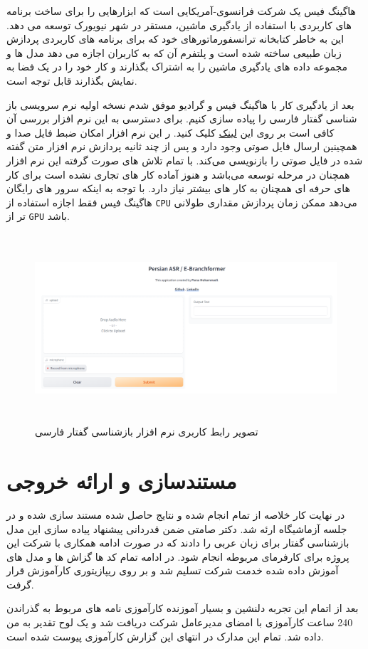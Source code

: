 هاگینگ فیس یک شرکت فرانسوی-آمریکایی است که ابزارهایی را برای ساخت برنامه های کاربردی با استفاده از یادگیری ماشین، مستقر در شهر نیویورک توسعه می دهد. این به خاطر کتابخانه ترانسفورماتورهای خود که برای برنامه های کاربردی پردازش زبان طبیعی ساخته شده است و پلتفرم آن که به کاربران اجازه می دهد مدل ها و مجموعه داده های یادگیری ماشین را به اشتراک بگذارند و کار خود را در یک فضا به نمایش بگذارند قابل توجه است.\cite{wolf2020huggingfaces}

بعد از یادگیری کار با هاگینگ فیس و گرادیو موفق شدم نسخه اولیه نرم سرویسی باز شناسی گفتار فارسی را پیاده سازی کنیم. برای دسترسی به این نرم افزار بررسی آن کافی است بر روی این \href{https://huggingface.co/spaces/parsa-mhmdi/persian-asr}{لینک} کلیک کنید.
ر این نرم افزار امکان ضبط فایل صدا و همچینین ارسال فایل صوتی وجود دارد و پس از چند ثانیه پردازش نرم افزار متن گفته شده در فایل صوتی را بازنویسی می‌کند.
با تمام تلاش های صورت گرفته این نرم افزار همچنان در مرحله توسعه می‌باشد و هنوز آماده کار های تجاری نشده است برای کار های حرفه ای همچنان به کار های بیشتر نیاز دارد. با توجه به اینکه سرور های رایگان هاگینگ فیس فقط اجازه استفاده از
\verb|CPU|
می‌دهد ممکن زمان پردازش مقداری طولانی تر از \verb|GPU|
باشد.

\begin{figure}[H]
  \centering
  \includegraphics[width=1\textwidth,height=7cm]{Images/Chapter3/UI.png}
  \caption{
  تصویر رابط کاربری نرم افزار بازشناسی گفتار فارسی 
  }
  \label{fig:UI}
\end{figure}

\section{مستندسازی و ارائه خروجی}
در نهایت کار خلاصه از تمام انجام شده و نتایج حاصل شده مستند سازی شده و در جلسه آزماشیگاه ارئه شد. دکتر صامتی ضمن قدردانی پیشنهاد پیاده سازی این مدل بازشناسی گفتار برای زبان عربی را دادند که در صورت ادامه همکاری با شرکت این پروژه برای کارفرمای مربوطه انجام شود. در ادامه تمام کد ها گزاش ها و مدل های آموزش داده شده خدمت شرکت تسلیم شد و بر روی ریپازیتوری کارآموزش قرار گرفت.

بعد از اتمام این تجربه دلنشین و بسیار آموزنده کارآموزی نامه های مربوط به گذراندن 240 ساعت کارآموزی با امضای مدیرعامل شرکت دریافت شد و یک لوح تقدیر به من داده شد. تمام این مدارک در انتهای این گزارش کارآموزی پیوست شده است.










